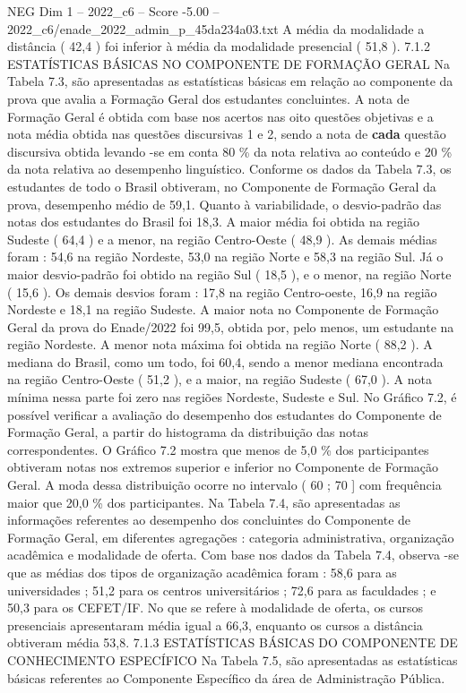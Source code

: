 \begin{textsample}{NEG Dim 1 – 2022\_c6 – Score -5.00 – 2022\_c6/enade\_2022\_admin\_p\_45da234a03.txt}
A média da modalidade a distância ( 42,4 ) foi inferior à média da modalidade presencial ( 51,8 ). 7.1.2 ESTATÍSTICAS BÁSICAS NO COMPONENTE DE FORMAÇÃO GERAL Na Tabela 7.3, são apresentadas as estatísticas básicas em relação ao componente da prova que avalia a Formação Geral dos estudantes concluintes.
A nota de Formação Geral é obtida com base nos acertos nas oito questões objetivas e a nota média obtida nas questões discursivas 1 e 2, sendo a nota de \textbf{cada} questão discursiva obtida levando -se em conta 80 \% da nota relativa ao conteúdo e 20 \% da nota relativa ao desempenho linguístico.
Conforme os dados da Tabela 7.3, os estudantes de todo o Brasil obtiveram, no Componente de Formação Geral da prova, desempenho médio de 59,1.
Quanto à variabilidade, o desvio-padrão das notas dos estudantes do Brasil foi 18,3.
A maior média foi obtida na região Sudeste ( 64,4 ) e a menor, na região Centro-Oeste ( 48,9 ).
As demais médias foram : 54,6 na região Nordeste, 53,0 na região Norte e 58,3 na região Sul.
Já o maior desvio-padrão foi obtido na região Sul ( 18,5 ), e o menor, na região Norte ( 15,6 ).
Os demais desvios foram : 17,8 na região Centro-oeste, 16,9 na região Nordeste e 18,1 na região Sudeste.
A maior nota no Componente de Formação Geral da prova do Enade/2022 foi 99,5, obtida por, pelo menos, um estudante na região Nordeste.
A menor nota máxima foi obtida na região Norte ( 88,2 ).
A mediana do Brasil, como um todo, foi 60,4, sendo a menor mediana encontrada na região Centro-Oeste ( 51,2 ), e a maior, na região Sudeste ( 67,0 ).
A nota mínima nessa parte foi zero nas regiões Nordeste, Sudeste e Sul.
No Gráfico 7.2, é possível verificar a avaliação do desempenho dos estudantes do Componente de Formação Geral, a partir do histograma da distribuição das notas correspondentes.
O Gráfico 7.2 mostra que menos de 5,0 \% dos participantes obtiveram notas nos extremos superior e inferior no Componente de Formação Geral.
A moda dessa distribuição ocorre no intervalo ( 60 ; 70 ] com frequência maior que 20,0 \% dos participantes.
Na Tabela 7.4, são apresentadas as informações referentes ao desempenho dos concluintes do Componente de Formação Geral, em diferentes agregações : categoria administrativa, organização acadêmica e modalidade de oferta.
Com base nos dados da Tabela 7.4, observa -se que as médias dos tipos de organização acadêmica foram : 58,6 para as universidades ; 51,2 para os centros universitários ; 72,6 para as faculdades ; e 50,3 para os CEFET/IF.
No que se refere à modalidade de oferta, os cursos presenciais apresentaram média igual a 66,3, enquanto os cursos a distância obtiveram média 53,8. 7.1.3 ESTATÍSTICAS BÁSICAS DO COMPONENTE DE CONHECIMENTO ESPECÍFICO Na Tabela 7.5, são apresentadas as estatísticas básicas referentes ao Componente Específico da área de Administração Pública.

\end{textsample}
